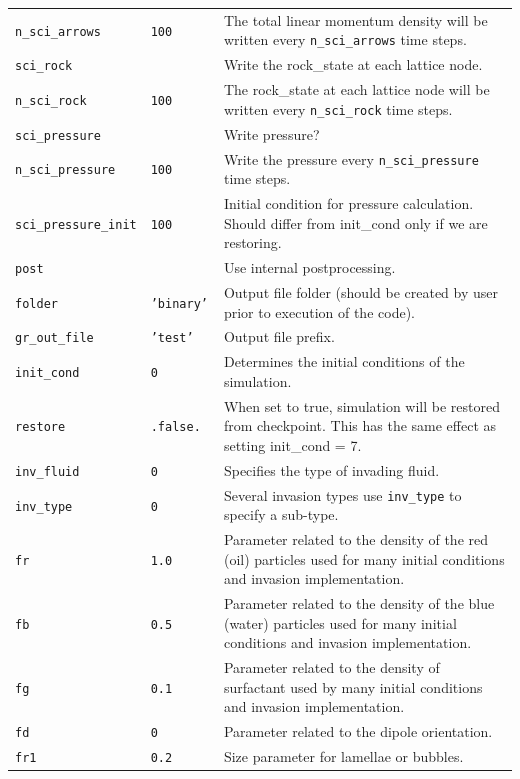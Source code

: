 \documentclass[a4paper]{article}
\begin{document}
\begin{center}
\begin{longtable}{|l|l|p{}|}
{\tt n\_sci\_arrows  }	&	{\tt 100 }	&
		The total linear momentum density will be written every
		{\tt n\_sci\_arrows}  time steps.\\		
{\tt sci\_rock  }	&	{\tt \ffalse }	& Write the rock\_state at each lattice node. \\
{\tt n\_sci\_rock  }	&	{\tt 100 }	& The rock\_state at each lattice node will be written every {\tt n\_sci\_rock} time steps.\\
{\tt sci\_pressure}	&	{\tt \ffalse }  & Write pressure? \\
{\tt n\_sci\_pressure}     & {\tt 100 }        & Write the pressure every {\tt n\_sci\_pressure} time steps.\\
{\tt sci\_pressure\_init} & {\tt 100 }        &
    Initial condition for pressure calculation. Should differ from init\_cond only if we are restoring.\\
{\tt post }	&	{\tt \ffalse }	&
		Use internal postprocessing.\\
{\tt folder  }	&	{\tt 'binary' }	& Output file folder (should be
created by user prior to execution of the code). \\
{\tt gr\_out\_file  }	&	{\tt 'test' }	& Output file prefix. \\
{\tt init\_cond  }	&	{\tt 0 }	& Determines the initial conditions of the simulation.\\
{\tt restore}           &       {\tt .false. }  & When set to true, simulation will be restored from checkpoint. This has the same effect as setting init\_cond = 7. \\
{\tt inv\_fluid  }	&	{\tt 0 }	& Specifies the type of invading fluid.\\
{\tt inv\_type  }	&	{\tt 0 }	& Several invasion types use {\tt inv\_type} to specify a sub-type.\\
{\tt fr  }	&	{\tt 1.0 }	& Parameter related to the density of the
red (oil) particles used for many initial conditions and invasion implementation. \\
{\tt fb  }	&	{\tt 0.5 }	& Parameter related to the density of the
blue (water) particles used for many initial conditions and invasion implementation. \\
{\tt fg  }	&	{\tt 0.1 }	& Parameter related to the density of surfactant
 used by many initial conditions and invasion implementation. \\
{\tt fd  }	&	{\tt 0 }	& Parameter related to the dipole orientation.\\
{\tt fr1  }	&	{\tt 0.2 }	& Size parameter for lamellae or bubbles. \\

\end{longtable}
\end{center}
\end{document}
